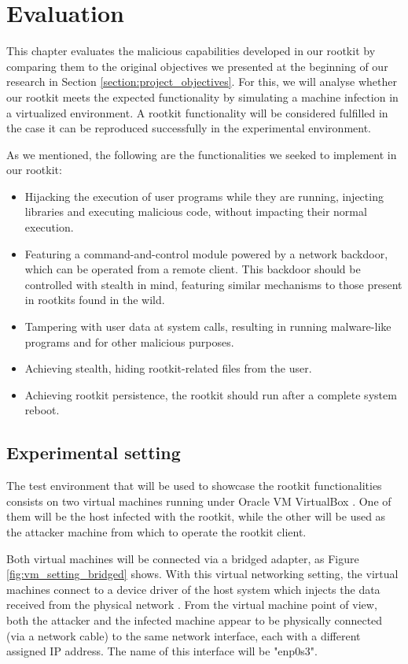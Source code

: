 \chapter{Evaluation} \label{chapter:evaluation}
This chapter evaluates the malicious capabilities developed in our rootkit by comparing them to the original objectives we presented at the beginning of our research in Section \ref{section:project_objectives}. For this, we will analyse whether our rootkit meets the expected functionality by simulating a machine infection in a virtualized environment. A rootkit functionality will be considered fulfilled in the case it can be reproduced successfully in the experimental environment.

As we mentioned, the following are the functionalities we seeked to implement in our rootkit:
\begin{itemize}
\item Hijacking the execution of user programs while they are running, injecting libraries and executing malicious code, without impacting their normal execution.
\item Featuring a command-and-control module powered by a network backdoor, which can be operated from a remote client. This backdoor should be controlled with stealth in mind, featuring similar mechanisms to those present in rootkits found in the wild.
\item Tampering with user data at system calls, resulting in running malware-like programs and for other malicious purposes.
\item Achieving stealth, hiding rootkit-related files from the user.
\item Achieving rootkit persistence, the rootkit should run after a complete system reboot.
\end{itemize}

\section{Experimental setting}
The test environment that will be used to showcase the rootkit functionalities consists on two virtual machines running under Oracle VM VirtualBox \cite{virtualbox_page}. One of them will be the host infected with the rootkit, while the other will be used as the attacker machine from which to operate the rootkit client. 

Both virtual machines will be connected via a bridged adapter, as Figure \ref{fig:vm_setting_bridged} shows. With this virtual networking setting, the virtual machines connect to a device driver of the host system which injects the data received from the physical network \cite{bridged_networking}. From the virtual machine point of view, both the attacker and the infected machine appear to be physically connected (via a network cable) to the same network interface, each with a different assigned IP address. The name of this interface will be "enp0s3".

